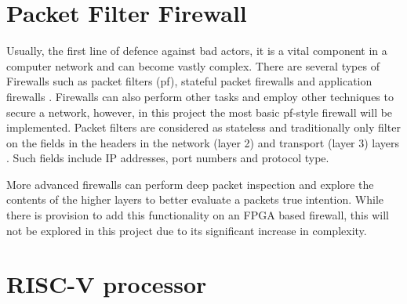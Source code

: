 \section{Packet Filter Firewall}

Usually, the first line of defence against bad actors, it is a vital component in a computer network and can become vastly complex. There are several
types of Firewalls such as packet filters (pf), stateful packet firewalls and application firewalls \cite{FirewallsBook}. Firewalls can also perform 
other tasks and employ other techniques to secure a network, however, in this project the most basic pf-style firewall will be implemented. 
Packet filters are considered as stateless and traditionally only filter on the fields in the headers in the network (layer 2) and transport 
(layer 3) layers \cite{FirewallsBook}. Such fields include IP addresses, port numbers and protocol type.

More advanced firewalls can perform deep packet inspection and explore the contents of the higher layers to better evaluate a packets true intention. 
While there is provision to add this functionality on an FPGA based firewall, this will not be explored in this project due to its significant increase 
in complexity. 


\section{RISC-V processor}

